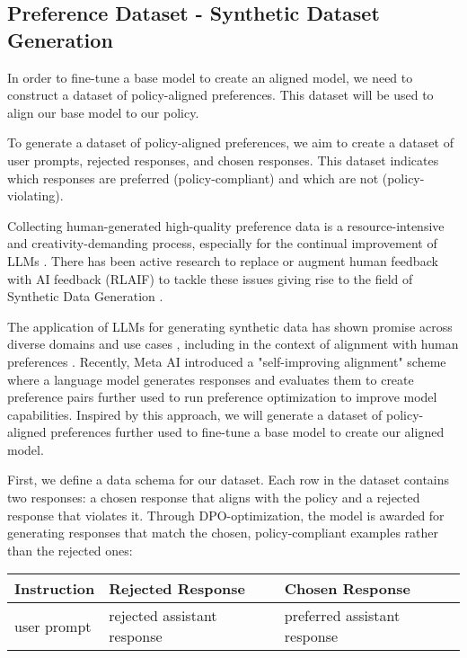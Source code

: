 \subsection{Preference Dataset - Synthetic Dataset Generation}

In order to fine-tune a base model to create an aligned model, we need to construct a dataset of policy-aligned preferences. This dataset will be used to align our base model to our policy.

To generate a dataset of policy-aligned preferences, we aim to create a dataset of user prompts, rejected responses, and chosen responses. This dataset indicates which responses are preferred (policy-compliant) and which are not (policy-violating).

Collecting human-generated high-quality preference data is a resource-intensive and creativity-demanding process, especially for the continual improvement of LLMs . There has been active research to replace or augment human feedback with AI feedback (RLAIF) to tackle these issues  giving rise to the field of Synthetic Data Generation .

The application of LLMs for generating synthetic data has shown promise across diverse domains and use cases , including in the context of alignment with human preferences . Recently, Meta AI  introduced a "self-improving alignment" scheme where a language model generates responses and evaluates them to create preference pairs further used to run preference optimization to improve model capabilities. Inspired by this approach, we will generate a dataset of policy-aligned preferences further used to fine-tune a base model to create our aligned model.

First, we define a data schema for our dataset. Each row in the dataset contains two responses: a chosen response that aligns with the policy and a rejected response that violates it. Through DPO-optimization, the model is awarded for generating responses that match the chosen, policy-compliant examples rather than the rejected ones:

\begin{table}[H]
\centering
\begin{tabular}{|l|l|l|}
\hline
Instruction & Rejected Response & Chosen Response \\
\hline
user prompt & rejected assistant response & preferred assistant response \\
\hline
\end{tabular}
\end{table}

